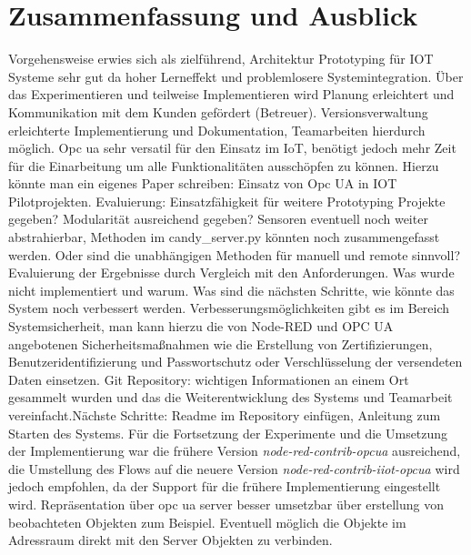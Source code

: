 \documentclass[BMR,Bachelor,ngerman]{twbook}%
\begin{document}
\chapter{Zusammenfassung und Ausblick}
Vorgehensweise erwies sich als zielführend, Architektur Prototyping für IOT Systeme sehr gut da hoher Lerneffekt und problemlosere Systemintegration. Über das Experimentieren und teilweise Implementieren wird Planung erleichtert und Kommunikation mit dem Kunden gefördert (Betreuer).
Versionsverwaltung erleichterte Implementierung und Dokumentation, Teamarbeiten hierdurch möglich.
Opc ua sehr versatil für den Einsatz im IoT, benötigt jedoch mehr Zeit für die Einarbeitung um alle Funktionalitäten ausschöpfen zu können. Hierzu könnte man ein eigenes Paper schreiben: Einsatz von Opc UA in IOT Pilotprojekten.
Evaluierung: Einsatzfähigkeit für weitere Prototyping Projekte gegeben? Modularität ausreichend gegeben? Sensoren eventuell noch weiter abstrahierbar, Methoden im candy\_server.py könnten noch zusammengefasst werden. Oder sind die unabhängigen Methoden für manuell und remote sinnvoll?
Evaluierung der Ergebnisse durch Vergleich mit den Anforderungen. Was wurde nicht implementiert und warum. Was sind die nächsten Schritte, wie könnte das System noch verbessert werden. Verbesserungsmöglichkeiten gibt es im Bereich Systemsicherheit, man kann hierzu die von Node-RED und \ac{OPC UA} angebotenen Sicherheitsmaßnahmen wie die Erstellung von Zertifizierungen, Benutzeridentifizierung und Passwortschutz oder Verschlüsselung der versendeten Daten einsetzen. Git Repository: wichtigen Informationen an einem Ort gesammelt wurden und das die Weiterentwicklung des Systems und Teamarbeit vereinfacht.Nächste Schritte: Readme im Repository einfügen, Anleitung zum Starten des Systems.
 {\color{purple}Für die Fortsetzung der Experimente und die Umsetzung der Implementierung war die frühere Version \emph{node-red-contrib-opcua} ausreichend, die Umstellung des Flows auf die neuere Version \emph{node-red-contrib-iiot-opcua} wird jedoch empfohlen, da der Support für die frühere Implementierung eingestellt wird.} Repräsentation über opc ua server besser umsetzbar über erstellung von beobachteten Objekten zum Beispiel. Eventuell möglich die Objekte im Adressraum direkt mit den Server Objekten zu verbinden.
 \clearpage
%
\end{document}
